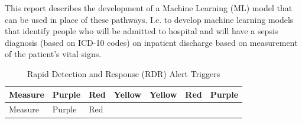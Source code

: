 \documentclass[
  a4paper,
  ,captions=tableheading
]{scrartcl}
\begin{document}
This report describes the development of a Machine Learning (ML) model
that can be used in place of these pathways. I.e. to develop machine
learning models that identify people who will be admitted to hospital
and will have a sepsis diagnosis (based on ICD-10 codes) on inpatient
discharge based on measurement of the patient's vital signs.

\begin{longtable}[]{@{}
  >{\raggedright\arraybackslash}p{}
  >{\centering\arraybackslash}p{}
  >{\centering\arraybackslash}p{}
  >{\centering\arraybackslash}p{}
  >{\centering\arraybackslash}p{}
  >{\centering\arraybackslash}p{}
  >{\centering\arraybackslash}p{}@{}}
\caption{\label{tbl:table1}Rapid Detection and Response (RDR) Alert
Triggers}\tabularnewline
\toprule\noalign{}
\begin{minipage}[b]{\linewidth}\raggedright
Measure
\end{minipage} & \begin{minipage}[b]{\linewidth}\centering
Purple
\end{minipage} & \begin{minipage}[b]{\linewidth}\centering
Red
\end{minipage} & \begin{minipage}[b]{\linewidth}\centering
Yellow
\end{minipage} & \begin{minipage}[b]{\linewidth}\centering
Yellow
\end{minipage} & \begin{minipage}[b]{\linewidth}\centering
Red
\end{minipage} & \begin{minipage}[b]{\linewidth}\centering
Purple
\end{minipage} \\
\midrule\noalign{}
\endfirsthead
\toprule\noalign{}
\begin{minipage}[b]{\linewidth}\raggedright
Measure
\end{minipage} & \begin{minipage}[b]{\linewidth}\centering
Purple
\end{minipage} & \begin{minipage}[b]{\linewidth}\centering
Red
\end{minipage} & \begin{minipage}[b]{\linewidth}\centering

\end{minipage}
\end{longtable}
\end{document}
